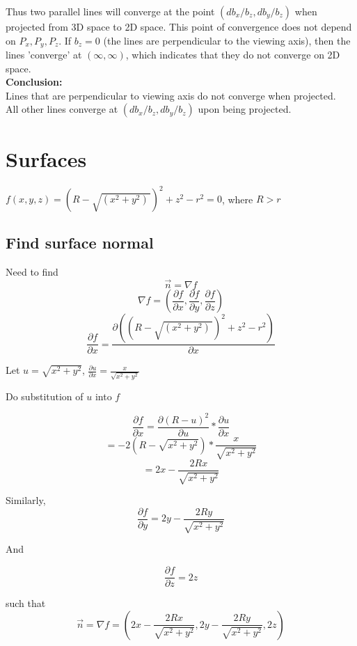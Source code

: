 \documentclass[a4paper,10pt]{scrartcl}
\begin{document}
Thus two parallel lines will converge at the point $(db_x/b_z, db_y/b_z)$ when projected from 3D space to 2D space. This point of convergence
does not depend on $P_x, P_y, P_z$. If $b_z = 0$ (the lines are perpendicular to the viewing axis), 
then the lines 'converge' at $(\infty, \infty)$, which indicates that they do not converge on 2D space.\\

{\bfseries Conclusion:}\\

Lines that are perpendicular to viewing axis do not converge when projected.\\
All other lines converge at $(db_x/b_z, db_y/b_z)$ upon being projected.




\section{Surfaces}

$f(x,y,z) = (R - \sqrt{(x^2 + y^2) \,})^2 + z^2 - r^2 = 0$, where $ R > r$

\subsection{Find surface normal}


Need to find \[ \vec n = \nabla f\]
\[ \nabla f = ( \frac{\partial f}{\partial x}, \frac{\partial f}{\partial y}, \frac{\partial f}{\partial z})\]
\[ \frac{\partial f}{\partial x} = \frac{\partial ((R - \sqrt{(x^2 + y^2) \,})^2 + z^2 - r^2)}{\partial x}\]

Let $u = \sqrt{x ^2 + y^2}$, $\frac{\partial u}{\partial x} = \frac{x}{\sqrt{x ^2 + y^2}}$

Do substitution of $u$ into $f$

\[ \frac{\partial f}{\partial x} = \frac{\partial (R - u)^2}{\partial u} * \frac{\partial u}{\partial x}\]
\[ = -2 (R - \sqrt{x^2 + y^2}) * \frac{x}{\sqrt{x^2 + y^2}}\]
\[ = 2x - \frac{2Rx}{\sqrt{x^2+y^2}}\]

Similarly, 
\[\frac{\partial f}{\partial y} = 2y - \frac{2Ry}{\sqrt{x^2+y^2}}\]

And

\[\frac{\partial f}{\partial z} = 2z\]

such that \[ \vec n = \nabla f = (2x - \frac{2Rx}{\sqrt{x^2+y^2}}, 2y - \frac{2Ry}{\sqrt{x^2+y^2}}, 2z)\]

% 
% 
\end{document}

